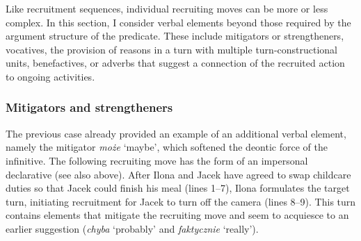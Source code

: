 \documentclass[output=paper]{langsci/langscibook}
\begin{document}
Like recruitment sequences, individual recruiting moves can be more or less complex.  In this section, I consider verbal elements beyond those required by the argument structure of the predicate.  These include mitigators or strengtheners, vocatives, the provision of reasons in a turn with multiple turn-constructional units, benefactives, or adverbs that suggest a connection of the recruited action to ongoing activities.

\subsubsection{Mitigators and strengtheners}

The previous case  already provided an example of an additional verbal element, namely the mitigator \textit{może} `maybe', which softened the deontic force of the infinitive.  The following recruiting move has the form of an impersonal declarative (see also  above).  After Ilona and Jacek have agreed to swap childcare duties so that Jacek could finish his meal (lines 1--7), Ilona formulates the target turn, initiating recruitment for Jacek to turn off the camera (lines 8--9).  This turn contains elements that mitigate the recruiting move and seem to acquiesce to an earlier suggestion (\textit{chyba} `probably' and \textit{faktycznie} `really').
\end{document}

